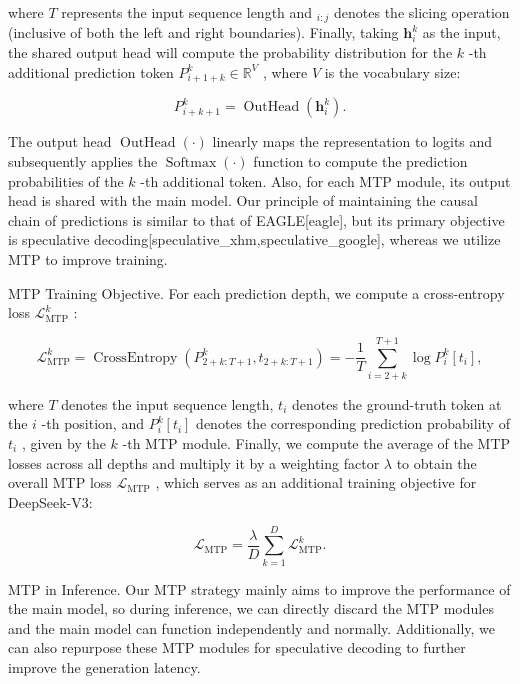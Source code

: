 \documentclass[11pt,a4paper]{article}
\begin{document}
where  $T$  represents the input sequence length and  $_{i:j}$  denotes the slicing operation (inclusive of both the left and right boundaries). Finally, taking  $\mathbf{h}_{i}^{k}$  as the input, the shared output head will compute the probability distribution for the  $k$ -th additional prediction token  $P_{i+1+k}^{k} \in \mathbb{R}^{V}$ , where  $V$  is the vocabulary size:

$$\begin{equation}
    P_{i+k+1}^{k} = \operatorname{OutHead}(\mathbf{h}_{i}^{k}).
\end{equation}$$

The output head  $\operatorname{OutHead}(\cdot)$  linearly maps the representation to logits and subsequently applies the  $\operatorname{Softmax}(\cdot)$  function to compute the prediction probabilities of the  $k$ -th additional token. Also, for each MTP module, its output head is shared with the main model. Our principle of maintaining the causal chain of predictions is similar to that of EAGLE[eagle], but its primary objective is speculative decoding[speculative\_xhm,speculative\_google], whereas we utilize MTP to improve training.

MTP Training Objective. For each prediction depth, we compute a cross-entropy loss  $\mathcal{L}_{\text{MTP}}^{k}$ :

$$\begin{equation}
    \mathcal{L}_{\text{MTP}}^{k} = \operatorname{CrossEntropy}(P_{2 + k:T + 1}^{k}, t_{2 + k:T + 1}) = -\frac{1}{T} \sum_{i=2 + k}^{T + 1} \log P_i^k [t_i],
\end{equation}$$

where  $T$  denotes the input sequence length,  $t_i$  denotes the ground-truth token at the  $i$ -th position, and  $P_i^k [t_i]$  denotes the corresponding prediction probability of  $t_i$ , given by the  $k$ -th MTP module. Finally, we compute the average of the MTP losses across all depths and multiply it by a weighting factor  $\lambda$  to obtain the overall MTP loss  $\mathcal{L}_{\text{MTP}}$ , which serves as an additional training objective for DeepSeek-V3:

$$\begin{equation}
    \mathcal{L}_{\text{MTP}} = \frac{\lambda}{D} \sum_{k=1}^{D} \mathcal{L}_{\text{MTP}}^{k}.
\end{equation}$$

MTP in Inference. Our MTP strategy mainly aims to improve the performance of the main model, so during inference, we can directly discard the MTP modules and the main model can function independently and normally. Additionally, we can also repurpose these MTP modules for speculative decoding to further improve the generation latency.
\end{document}

